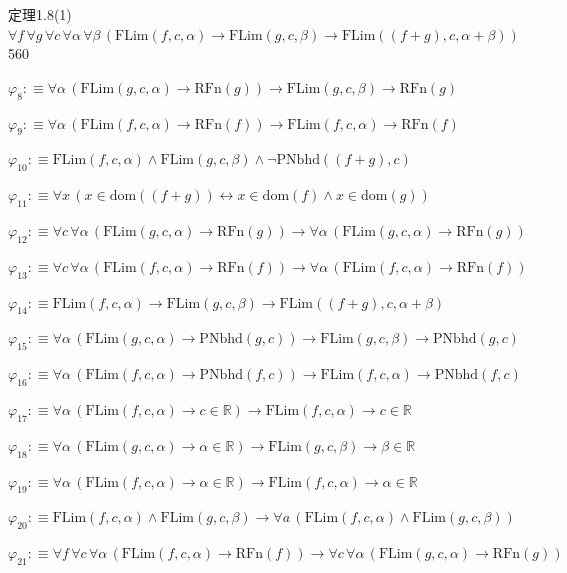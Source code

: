 \begin{fullproof}{定理1.8(1)}{$\forall f\,\forall g\,\forall c\,\forall \alpha\,\forall \beta\,(\mathrm{FLim}(f,c,\alpha) \to \mathrm{FLim}(g,c,\beta) \to \mathrm{FLim}((f + g),c,\alpha + \beta))$}{560}
\begin{abbrevlist}
\item $\varphi_{8} :\equiv \forall \alpha\,(\mathrm{FLim}(g,c,\alpha) \to \mathrm{RFn}(g)) \to \mathrm{FLim}(g,c,\beta) \to \mathrm{RFn}(g)$
\item $\varphi_{9} :\equiv \forall \alpha\,(\mathrm{FLim}(f,c,\alpha) \to \mathrm{RFn}(f)) \to \mathrm{FLim}(f,c,\alpha) \to \mathrm{RFn}(f)$
\item $\varphi_{10} :\equiv \mathrm{FLim}(f,c,\alpha) \land \mathrm{FLim}(g,c,\beta) \land \neg \mathrm{PNbhd}((f + g),c)$
\item $\varphi_{11} :\equiv \forall x\,(x \in \mathrm{dom}((f + g)) \leftrightarrow x \in \mathrm{dom}(f) \land x \in \mathrm{dom}(g))$
\item $\varphi_{12} :\equiv \forall c\,\forall \alpha\,(\mathrm{FLim}(g,c,\alpha) \to \mathrm{RFn}(g)) \to \forall \alpha\,(\mathrm{FLim}(g,c,\alpha) \to \mathrm{RFn}(g))$
\item $\varphi_{13} :\equiv \forall c\,\forall \alpha\,(\mathrm{FLim}(f,c,\alpha) \to \mathrm{RFn}(f)) \to \forall \alpha\,(\mathrm{FLim}(f,c,\alpha) \to \mathrm{RFn}(f))$
\item $\varphi_{14} :\equiv \mathrm{FLim}(f,c,\alpha) \to \mathrm{FLim}(g,c,\beta) \to \mathrm{FLim}((f + g),c,\alpha + \beta)$
\item $\varphi_{15} :\equiv \forall \alpha\,(\mathrm{FLim}(g,c,\alpha) \to \mathrm{PNbhd}(g,c)) \to \mathrm{FLim}(g,c,\beta) \to \mathrm{PNbhd}(g,c)$
\item $\varphi_{16} :\equiv \forall \alpha\,(\mathrm{FLim}(f,c,\alpha) \to \mathrm{PNbhd}(f,c)) \to \mathrm{FLim}(f,c,\alpha) \to \mathrm{PNbhd}(f,c)$
\item $\varphi_{17} :\equiv \forall \alpha\,(\mathrm{FLim}(f,c,\alpha) \to c \in \mathbb{R}) \to \mathrm{FLim}(f,c,\alpha) \to c \in \mathbb{R}$
\item $\varphi_{18} :\equiv \forall \alpha\,(\mathrm{FLim}(g,c,\alpha) \to \alpha \in \mathbb{R}) \to \mathrm{FLim}(g,c,\beta) \to \beta \in \mathbb{R}$
\item $\varphi_{19} :\equiv \forall \alpha\,(\mathrm{FLim}(f,c,\alpha) \to \alpha \in \mathbb{R}) \to \mathrm{FLim}(f,c,\alpha) \to \alpha \in \mathbb{R}$
\item $\varphi_{20} :\equiv \mathrm{FLim}(f,c,\alpha) \land \mathrm{FLim}(g,c,\beta) \to \forall a\,(\mathrm{FLim}(f,c,\alpha) \land \mathrm{FLim}(g,c,\beta))$
\item $\varphi_{21} :\equiv \forall f\,\forall c\,\forall \alpha\,(\mathrm{FLim}(f,c,\alpha) \to \mathrm{RFn}(f)) \to \forall c\,\forall \alpha\,(\mathrm{FLim}(g,c,\alpha) \to \mathrm{RFn}(g))$

\end{abbrevlist}
\end{fullproof}
